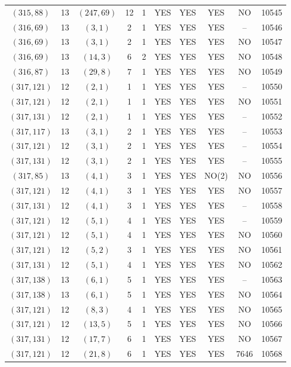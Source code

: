 \begin{longtable}{|c|c|c|c|c|c|c|c|c|c|}
$(315, 88)$ & 13 & $(247, 69)$ & 12 & 1 & YES & YES & YES & NO & 10545\\
$(316, 69)$ & 13 & $(3, 1)$ & 2 & 1 & YES & YES & YES & -- & 10546\\
$(316, 69)$ & 13 & $(3, 1)$ & 2 & 1 & YES & YES & YES & NO & 10547\\
$(316, 69)$ & 13 & $(14, 3)$ & 6 & 2 & YES & YES & YES & NO & 10548\\
$(316, 87)$ & 13 & $(29, 8)$ & 7 & 1 & YES & YES & YES & NO & 10549\\
$(317, 121)$ & 12 & $(2, 1)$ & 1 & 1 & YES & YES & YES & -- & 10550\\
$(317, 121)$ & 12 & $(2, 1)$ & 1 & 1 & YES & YES & YES & NO & 10551\\
$(317, 131)$ & 12 & $(2, 1)$ & 1 & 1 & YES & YES & YES & -- & 10552\\
$(317, 117)$ & 13 & $(3, 1)$ & 2 & 1 & YES & YES & YES & -- & 10553\\
$(317, 121)$ & 12 & $(3, 1)$ & 2 & 1 & YES & YES & YES & -- & 10554\\
$(317, 131)$ & 12 & $(3, 1)$ & 2 & 1 & YES & YES & YES & -- & 10555\\
$(317, 85)$ & 13 & $(4, 1)$ & 3 & 1 & YES & YES & NO(2) & NO & 10556\\
$(317, 121)$ & 12 & $(4, 1)$ & 3 & 1 & YES & YES & YES & NO & 10557\\
$(317, 131)$ & 12 & $(4, 1)$ & 3 & 1 & YES & YES & YES & -- & 10558\\
$(317, 121)$ & 12 & $(5, 1)$ & 4 & 1 & YES & YES & YES & -- & 10559\\
$(317, 121)$ & 12 & $(5, 1)$ & 4 & 1 & YES & YES & YES & NO & 10560\\
$(317, 121)$ & 12 & $(5, 2)$ & 3 & 1 & YES & YES & YES & NO & 10561\\
$(317, 131)$ & 12 & $(5, 1)$ & 4 & 1 & YES & YES & YES & NO & 10562\\
$(317, 138)$ & 13 & $(6, 1)$ & 5 & 1 & YES & YES & YES & -- & 10563\\
$(317, 138)$ & 13 & $(6, 1)$ & 5 & 1 & YES & YES & YES & NO & 10564\\
$(317, 121)$ & 12 & $(8, 3)$ & 4 & 1 & YES & YES & YES & NO & 10565\\
$(317, 121)$ & 12 & $(13, 5)$ & 5 & 1 & YES & YES & YES & NO & 10566\\
$(317, 131)$ & 12 & $(17, 7)$ & 6 & 1 & YES & YES & YES & NO & 10567\\
$(317, 121)$ & 12 & $(21, 8)$ & 6 & 1 & YES & YES & YES & 7646 & 10568\\

\end{longtable}
